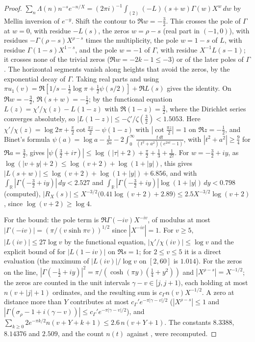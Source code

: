 \begin{proof}
$\sum_n\Lambda(n)n^{-s}e^{-n/X}=(2\pi i)^{-1}\int_{(2)}(-L)(s+w)\Gamma(w)X^w\,dw$ by Mellin inversion of $e^{-y}$. Shift the contour to $\Re w=-\tfrac32$. This crosses the pole of $\Gamma$ at $w=0$, with residue $-L(s)$, the zeros $w=\rho-s$ (real part in $(-1,0)$), with residues $-\Gamma(\rho-s)X^{\rho-s}$ times the multiplicity, the pole $w=1-s$ of $L$, with residue $\Gamma(1-s)X^{1-s}$, and the pole $w=-1$ of $\Gamma$, with residue $X^{-1}L(s-1)$; it crosses none of the trivial zeros ($\Re w=-2k-1\le-3$) or of the later poles of $\Gamma$. The horizontal segments vanish along heights that avoid the zeros, by the exponential decay of $\Gamma$. Taking real parts and using $\pi u_1(v)=\Re[1/s-\tfrac12\log\pi+\tfrac12\psi(s/2)]+\Re L(s)$ gives the identity. On $\Re w=-\tfrac32$, $\Re(s+w)=-\tfrac12$; by the functional equation $L(z)=\chi'/\chi(z)-L(1-z)$ with $\Re(1-z)=\tfrac32$, where the Dirichlet series converges absolutely, so $|L(1-z)|\le-\zeta'/\zeta(\tfrac32)<1.5053$. Here $\chi'/\chi(z)=\log2\pi+\tfrac\pi2\cot\tfrac{\pi z}2-\psi(1-z)$ with $|\cot\tfrac{\pi z}2|=1$ on $\Re z=-\tfrac12$, and Binet's formula $\psi(a)=\log a-\tfrac1{2a}-2\int_0^\infty\frac{t\,dt}{(t^2+a^2)(e^{2\pi t}-1)}$, with $|t^2+a^2|\ge\tfrac94$ for $\Re a=\tfrac32$, gives $|\psi(\tfrac32+i\tau)|\le\log(|\tau|+2)+\tfrac\pi2+\tfrac13+\tfrac1{27}$. For $w=-\tfrac32+iy$, as $\log(|v+y|+2)\le\log(v+2)+\log(1+|y|)$, this gives $|L(s+w)|\le\log(v+2)+\log(1+|y|)+6.856$, and with $\int_{\mathbb R}|\Gamma(-\tfrac32+iy)|\,dy<2.527$ and $\int_{\mathbb R}|\Gamma(-\tfrac32+iy)|\log(1+|y|)\,dy<0.798$ (computed), $|R_X(s)|\le X^{-3/2}\bigl(0.41\log(v+2)+2.89\bigr)\le2.5X^{-3/2}\log(v+2)$, since $\log(v+2)\ge\log4$.

For the bound: the pole term is $\Re\Gamma(-iv)X^{-iv}$, of modulus at most $|\Gamma(-iv)|=(\pi/(v\sinh\pi v))^{1/2}$ since $|X^{-iv}|=1$. For $v\ge5$, $|L(iv)|\le27\log v$ by the functional equation, $|\chi'/\chi(iv)|\le\log v$ and the explicit bound of \cite{Leong24} for $|L(1-iv)|$ on $\Re s=1$; for $2\le v\le5$ it is a direct evaluation (the maximum of $|L(iv)|/\log v$ on $[2,60]$ is $1.014$). For the zeros on the line, $|\Gamma(-\tfrac12+iy)|^2=\pi/(\cosh(\pi y)(\tfrac14+y^2))$ and $|X^{\rho-s}|=X^{-1/2}$; the zeros are counted in the unit intervals $\gamma-v\in[j,j+1)$, each holding at most $n(v+|j|+1)$ ordinates, and the resulting sum is $c_\Gamma n(v)X^{-1/2}$. A zero at distance more than $Y$ contributes at most $c_\Gamma'e^{-\pi|\gamma-v|/2}$ ($|X^{\rho-s}|\le1$ and $|\Gamma(\sigma_\rho-1+i(\gamma-v))|\le c_\Gamma'e^{-\pi|\gamma-v|/2}$), and $\sum_{k\ge0}2e^{-\pi k/2}n(v+Y+k+1)\le2.6\,n(v+Y+1)$. The constants $8.3388$, $8.14376$ and $2.509$, and the count $n(t)$ against \cite{HSW22}, were recomputed.
\end{proof}

